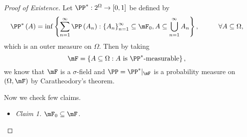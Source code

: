 \documentclass[stat901]{subfiles}
\begin{document}
    \begin{proof}[Proof of Existence]
        Let $\PP^{*}:2^{\Omega}\to\left[ 0,1 \right]$ be defined by
        \begin{equation*}
            \PP^{*}\left( A \right) = \inf \left\lbrace \sum^{\infty}_{n=1} \PP\left( A_n \right) : \left\lbrace A_n \right\rbrace^{\infty}_{n=1}\subseteq\mF_0, A\subseteq\bigcup^{\infty}_{n=1} A_n \right\rbrace,\hspace{1cm}\forall A\subseteq\Omega,
        \end{equation*}
        which is an outer measure on $\Omega$. Then by taking
        \begin{equation*}
            \mF = \left\lbrace A\subseteq\Omega : \text{$A$ is $\PP^{*}$-measurable} \right\rbrace,
        \end{equation*}
        we know that $\mF$ is a $\sigma$-field and $\PP = \PP^{*}|_{\mF}$ is a probability measure on $\left( \Omega,\mF \right)$ by Caratheodory's theorem.

        Now we check few claims.
        \begin{itemize}
            \item \textit{Claim 1. $\mF_0\subseteq\mF$.}


\end{itemize}
\end{proof}
\end{document}
